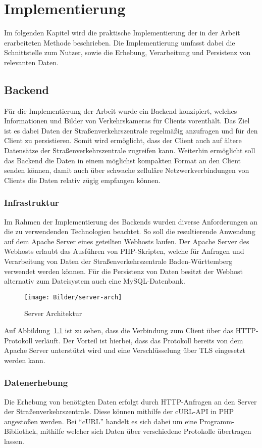 \chapter{Implementierung}
Im folgenden Kapitel wird die praktische Implementierung der in der Arbeit erarbeiteten Methode beschrieben. Die Implementierung umfasst dabei die Schnittstelle zum Nutzer, sowie die Erhebung, Verarbeitung und Persistenz von relevanten Daten.
\section{Backend}
Für die Implementierung der Arbeit wurde ein Backend konzipiert, welches Informationen und Bilder von Verkehrskameras für Clients vorenthält. Das Ziel ist es dabei Daten der Straßenverkehrszentrale regelmäßig anzufragen und für den Client zu persistieren. Somit wird ermöglicht, dass der Client auch auf ältere Datensätze der Straßenverkehrszentrale zugreifen kann. Weiterhin ermöglicht soll das Backend die Daten in einem möglichst kompakten Format an den Client senden können, damit auch über schwache zelluläre Netzwerkverbindungen von Clients die Daten relativ zügig empfangen können. 
\subsection{Infrastruktur}
Im Rahmen der Implementierung des Backends wurden diverse Anforderungen an die zu verwendenden Technologien beachtet. So soll die resultierende Anwendung auf dem Apache Server eines geteilten Webhosts laufen. Der Apache Server des Webhosts erlaubt das Ausführen von PHP-Skripten, welche für Anfragen und Verarbeitung von Daten der Straßenverkehrszentrale Baden-Württemberg verwendet werden können. Für die Persistenz von Daten besitzt der Webhost alternativ zum Dateisystem auch eine MySQL-Datenbank.
\begin{figure}[hp]
   \centering
     \texttt{[image: Bilder/server-arch]} \\
 \caption{Server Architektur}
 \label{fig:serverarch}
\end{figure}

Auf Abbildung~\ref{fig:serverarch} ist zu sehen, dass die Verbindung zum Client über das HTTP-Protokoll verläuft. Der Vorteil ist hierbei, dass das Protokoll bereits von dem Apache Server unterstützt wird und eine Verschlüsselung über TLS eingesetzt werden kann.
\subsection{Datenerhebung}
\label{sec:datenerhebung}
Die Erhebung von benötigten Daten erfolgt durch HTTP-Anfragen an den Server der Straßenverkehrszentrale. Diese können mithilfe der cURL-API in PHP angestoßen werden. Bei "`cURL"' handelt es sich dabei um eine Programm-Bibliothek, mithilfe welcher sich Daten über verschiedene Protokolle übertragen lassen.


